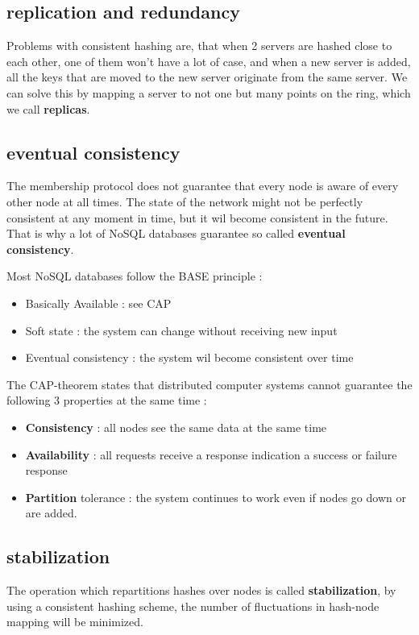 \documentclass{report}
\begin{document}
			\subsection{replication and redundancy}
				Problems with consistent hashing are, that when 2 servers are hashed close to each other, one of them won't have a lot of case, and when a new server is added, all the keys that are moved to the new server originate from the same server. We can solve this by mapping a server to not one but many points on the ring, which we call \textbf{replicas}.
			\subsection{eventual consistency}
				The membership protocol does not guarantee that every node is aware of every other node at all times. The state of the network might not be perfectly consistent at any moment in time, but it wil become consistent in the future. That is why a lot of NoSQL databases guarantee so called \textbf{eventual consistency}.

				Most NoSQL databases follow the BASE principle : 
				\begin{itemize}
					\item Basically Available : see CAP
					\item Soft state : the system can change without receiving new input
					\item Eventual consistency : the system wil become consistent over time
				\end{itemize}
				The CAP-theorem states that distributed computer systems cannot guarantee the following 3 properties at the same time : 
				\begin{itemize}
					\item \textbf{Consistency} : all nodes see the same data at the same time
					\item \textbf{Availability} : all requests receive a response indication a success or failure response 
					\item \textbf{Partition} tolerance : the system continues to work even if nodes go down or are added.
				\end{itemize}
			\subsection{stabilization}
				The operation which repartitions hashes over nodes is called \textbf{stabilization}, by using a consistent hashing scheme, the number of fluctuations in hash-node mapping will be minimized.
\end{document}

